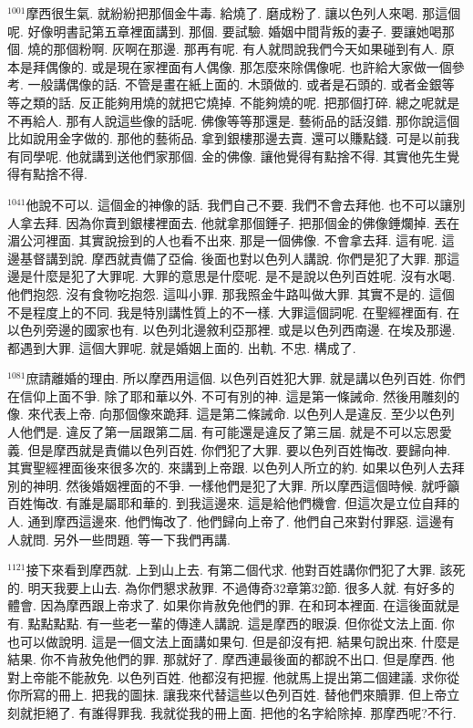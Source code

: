 \documentclass{book}
\begin{document}
$^{1001}$摩西很生氣.
就紛紛把那個金牛毒.
給燒了.
磨成粉了.
讓以色列人來喝.
那這個呢.
好像明書記第五章裡面講到.
那個.
要試驗.
婚姻中間背叛的妻子.
要讓她喝那個.
燒的那個粉啊.
灰啊在那邊.
那再有呢.
有人就問說我們今天如果碰到有人.
原本是拜偶像的.
或是現在家裡面有人偶像.
那怎麼來除偶像呢.
也許給大家做一個參考.
一般講偶像的話.
不管是畫在紙上面的.
木頭做的.
或者是石頭的.
或者金銀等等之類的話.
反正能夠用燒的就把它燒掉.
不能夠燒的呢.
把那個打碎.
總之呢就是不再給人.
那有人說這些像的話呢.
佛像等等那還是.
藝術品的話沒錯.
那你說這個比如說用金字做的.
那他的藝術品.
拿到銀樓那邊去賣.
還可以賺點錢.
可是以前我有同學呢.
他就講到送他們家那個.
金的佛像.
讓他覺得有點捨不得.
其實他先生覺得有點捨不得.

$^{1041}$他說不可以.
這個金的神像的話.
我們自己不要.
我們不會去拜他.
也不可以讓別人拿去拜.
因為你賣到銀樓裡面去.
他就拿那個錘子.
把那個金的佛像錘爛掉.
丟在湄公河裡面.
其實說撿到的人也看不出來.
那是一個佛像.
不會拿去拜.
這有呢.
這邊基督講到說.
摩西就責備了亞倫.
後面也對以色列人講說.
你們是犯了大罪.
那這邊是什麼是犯了大罪呢.
大罪的意思是什麼呢.
是不是說以色列百姓呢.
沒有水喝.
他們抱怨.
沒有食物吃抱怨.
這叫小罪.
那我照金牛路叫做大罪.
其實不是的.
這個不是程度上的不同.
我是特別講性質上的不一樣.
大罪這個詞呢.
在聖經裡面有.
在以色列旁邊的國家也有.
以色列北邊敘利亞那裡.
或是以色列西南邊.
在埃及那邊.
都遇到大罪.
這個大罪呢.
就是婚姻上面的.
出軌.
不忠.
構成了.

$^{1081}$庶請離婚的理由.
所以摩西用這個.
以色列百姓犯大罪.
就是講以色列百姓.
你們在信仰上面不爭.
除了耶和華以外.
不可有別的神.
這是第一條誡命.
然後用雕刻的像.
來代表上帝.
向那個像來跪拜.
這是第二條誡命.
以色列人是違反.
至少以色列人他們是.
違反了第一屆跟第二屆.
有可能還是違反了第三屆.
就是不可以忘恩愛義.
但是摩西就是責備以色列百姓.
你們犯了大罪.
要以色列百姓悔改.
要歸向神.
其實聖經裡面後來很多次的.
來講到上帝跟.
以色列人所立的約.
如果以色列人去拜別的神明.
然後婚姻裡面的不爭.
一樣他們是犯了大罪.
所以摩西這個時候.
就呼籲百姓悔改.
有誰是屬耶和華的.
到我這邊來.
這是給他們機會.
但這次是立位自拜的人.
通到摩西這邊來.
他們悔改了.
他們歸向上帝了.
他們自己來對付罪惡.
這邊有人就問.
另外一些問題.
等一下我們再講.

$^{1121}$接下來看到摩西就.
上到山上去.
有第二個代求.
他對百姓講你們犯了大罪.
該死的.
明天我要上山去.
為你們懇求赦罪.
不過傳奇32章第32節.
很多人就.
有好多的體會.
因為摩西跟上帝求了.
如果你肯赦免他們的罪.
在和珂本裡面.
在這後面就是有.
點點點點.
有一些老一輩的傳達人講說.
這是摩西的眼淚.
但你從文法上面.
你也可以做說明.
這是一個文法上面講如果句.
但是卻沒有把.
結果句說出來.
什麼是結果.
你不肯赦免他們的罪.
那就好了.
摩西連最後面的都說不出口.
但是摩西.
他對上帝能不能赦免.
以色列百姓.
他都沒有把握.
他就馬上提出第二個建議.
求你從你所寫的冊上.
把我的圖抹.
讓我來代替這些以色列百姓.
替他們來贖罪.
但上帝立刻就拒絕了.
有誰得罪我.
我就從我的冊上面.
把他的名字給除掉.
那摩西呢?不行.
\end{document}
